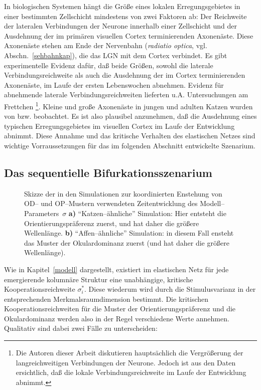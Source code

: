 In biologischen Systemen hängt die Größe eines lokalen Erregungsgebietes
in einer bestimmten Zellschicht mindestens von zwei Faktoren ab: Der
Reichweite der lateralen Verbindungen der Neurone innerhalb einer
Zellschicht und der Ausdehnung der im primären visuellen Cortex
terminierenden Axonenäste.  Diese Axonenäste stehen am Ende der
Nervenbahn (\emph{radiatio optica}, vgl. Abschn.~\ref{sehbahnkap}), die das
LGN mit dem Cortex verbindet.  Es gibt experimentelle Evidenz dafür, daß
beide Größen, sowohl die laterale Verbindungsreichweite als auch die
Ausdehnung der im Cortex terminierenden Axonenäste, im Laufe der ersten
Lebenswochen abnehmen. Evidenz für abnehmende laterale
Verbindungsreichweiten lieferten u.A. Untersuchungen am Frettchen
\cite{katz:1994}\footnote{Die Autoren dieser Arbeit diskutieren hauptsächlich
die Vergrößerung der langreichweitigen Verbindungen der Neurone. Jedoch
ist aus den Daten ersichtlich, daß die lokale Verbindungsreichweite im
Laufe der Entwicklung abnimmt.}. Kleine und große Axonenäste in jungen und
adulten Katzen wurden von 
bzw.  beobachtet.  Es ist also plausibel anzunehmen,
daß die Ausdehnung eines typischen Erregungsgebietes im visuellen Cortex
im Laufe der Entwicklung abnimmt. Diese Annahme und das kritische Verhalten
des elastischen Netzes sind wichtige Vorraussetzungen für das im folgenden
Abschnitt entwickelte Szenarium.
\setcounter{footnote}{1}

\subsection{Das sequentielle Bifurkationsszenarium}

\begin{figure}[t]
\centering
{}
\caption{Skizze der in den Simulationen zur koordinierten Enstehung von
OD-- und OP--Mustern verwendeten Zeitentwicklung des
Modell--Parameters~$\sigma$ \textbf{a)} ``Katzen--ähnliche'' Simulation:
Hier entsteht die Orientierungspräferenz zuerst, und hat daher die
größere Wellenlänge. \textbf{b)} ``Affen--ähnliche'' Simulation: in
diesem Fall ensteht das Muster der Okulardominanz zuerst (und hat daher die
größere Wellenlänge).}
\label{zeitentwicklung}
\end{figure}

Wie in Kapitel~\ref{modell} dargestellt, existiert im elastischen Netz für
jede emergierende kolumnäre Struktur eine unabhängige, kritische
Kooperationsreichweite $\sigma_i^\ast$.  Diese wiederum wird durch die
Stimulusvarianz  in der entsprechenden Merkmalsraumdimension bestimmt. Die
kritischen Kooperationsreichweiten für die Muster der
Orientierungspräferenz und die Okulardominanz werden also in der Regel
verschiedene Werte annehmen. Qualitativ sind dabei zwei Fälle zu
unterscheiden:

